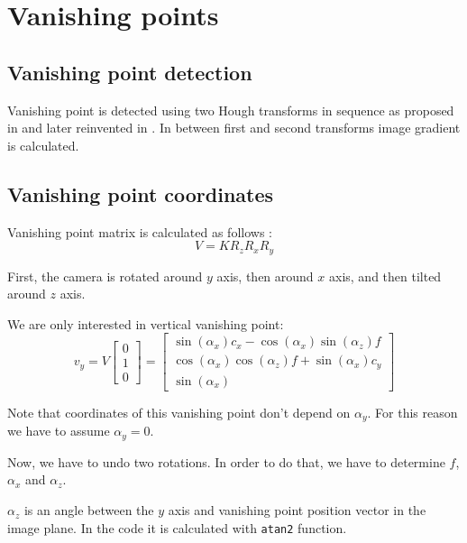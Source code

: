\documentclass{article}
\begin{document}
\section{Vanishing points}

\subsection{Vanishing point detection}

Vanishing point is detected using two Hough transforms in sequence as proposed in \cite{nikolaev2008hough} and later reinvented in \cite{chen2010new}.
In between first and second transforms image gradient is calculated.

\subsection{Vanishing point coordinates}

Vanishing point matrix is calculated as follows \cite{gallagher2005using}:
\begin{equation}
V = K R_z R_x R_y
\end{equation}

First, the camera is rotated around $y$ axis, then around $x$ axis, and then tilted around $z$ axis.

We are only interested in vertical vanishing point:
\begin{equation}
v_y = V \begin{bmatrix}
0 \\
1 \\
0
\end{bmatrix} =
\begin{bmatrix}
\sin(\alpha_x) c_x - \cos(\alpha_x) \sin(\alpha_z) f \\
\cos(\alpha_x) \cos(\alpha_z) f + \sin(\alpha_x) c_y \\
\sin(\alpha_x)
\end{bmatrix}
\end{equation}

Note that coordinates of this vanishing point don't depend on $\alpha_y$.
For this reason we have to assume $\alpha_y = 0$.

Now, we have to undo two rotations.
In order to do that, we have to determine $f$, $\alpha_x$ and $\alpha_z$.

$\alpha_z$ is an angle between the $y$ axis and vanishing point position vector in the image plane.
In the code it is calculated with \texttt{atan2} function.
\end{document}
